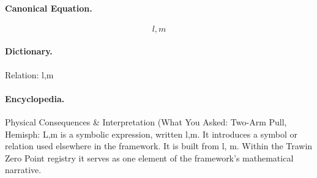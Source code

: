 \paragraph{Canonical Equation.}
\[
l,m
\]

\paragraph{Dictionary.}
Relation: l,m

\paragraph{Encyclopedia.}
Physical Consequences \& Interpretation (What You Asked: Two-Arm Pull, Hemisph: L,m is a symbolic expression, written l,m. It introduces a symbol or relation used elsewhere in the framework. It is built from l, m. Within the Trawin Zero Point registry it serves as one element of the framework's mathematical narrative.
